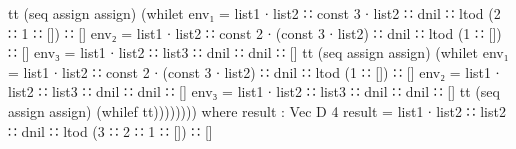 \begin{code}[fontsize=\footnotesize]
             tt
            (seq assign assign)
            (whilet {env₁ = list1 ∙ list2 ∷ const 3 ∙ list2 ∷
                            dnil ∷ ltod (2 ∷ 1 ∷ []) ∷ []}
                    {env₂ = list1 ∙ list2 ∷ const 2 ∙ (const 3 ∙ list2) ∷
                            dnil ∷ ltod (1 ∷ []) ∷ []}
                    {env₃ = list1 ∙ list2 ∷ list3 ∷ dnil ∷ dnil ∷ []}
             tt
            (seq assign assign)
            (whilet {env₁ = list1 ∙ list2 ∷ const 2 ∙ (const 3 ∙ list2) ∷
                            dnil ∷ ltod (1 ∷ []) ∷ []}
                    {env₂ = list1 ∙ list2 ∷ list3 ∷ dnil ∷ dnil ∷ []}
                    {env₃ = list1 ∙ list2 ∷ list3 ∷ dnil ∷ dnil ∷ []}
             tt
            (seq assign assign)
            (whilef tt))))))))
            where
               result : Vec D 4
               result = list1 ∙ list2 ∷ list2 ∷
                        dnil ∷ ltod (3 ∷ 2 ∷ 1 ∷ []) ∷ []
\end{code}